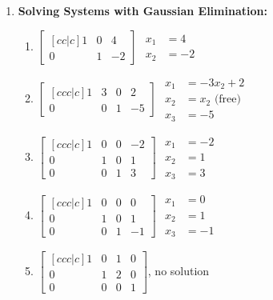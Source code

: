\begin{multicols}{2}
\begin{enumerate}
\begin{enumerate}
\end{enumerate}


\item \textbf{Solving Systems with Gaussian Elimination:} 
\begin{enumerate}
	\item 
$
\begin{bmatrix}[cc|c]
 1 & 0 & 4 \\
 0 & 1 & -2
\end{bmatrix}
$
$
\begin{array}{rl}
x_1&=4 \\
x_2&=-2 
\end{array}
$


	\item 
$
\begin{bmatrix}[ccc|c]
 1 & 3 & 0 & 2 \\
 0 & 0 & 1 & -5
\end{bmatrix}
$
$
\begin{array}{rl}
x_1&=-3x_2+2  \\
x_2&=x_2 \text{ (free)} \\
x_3&=-5
\end{array}
$


	\item 
$
\begin{bmatrix}[ccc|c]
 1 & 0 & 0 & -2 \\
 0 & 1 & 0 & 1 \\
 0 & 0 & 1 & 3
\end{bmatrix}
$
$
\begin{array}{rl}
x_1&=-2  \\
x_2&=1 \\
x_3&=3
\end{array}
$


	\item 
$
\begin{bmatrix}[ccc|c]
 1 & 0 & 0 & 0 \\
 0 & 1 & 0 & 1 \\
 0 & 0 & 1 & -1
\end{bmatrix}
$
$
\begin{array}{rl}
x_1&=0  \\
x_2&=1 \\
x_3&=-1
\end{array}
$


	\item 
$
\begin{bmatrix}[ccc|c]
 1 & 0 & 1 & 0 \\
 0 & 1 & 2 & 0 \\
 0 & 0 & 0 & 1
\end{bmatrix}
$,
no solution



\end{enumerate}
\end{enumerate}
\end{multicols}
